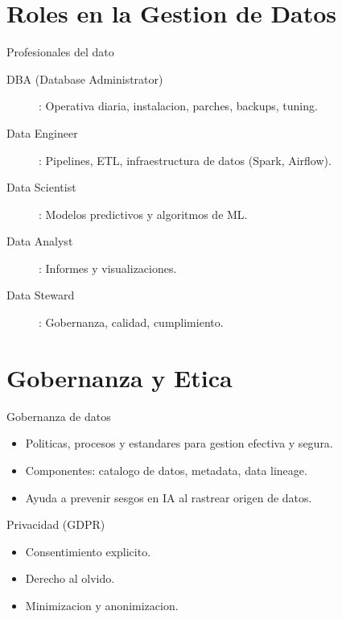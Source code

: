 \documentclass[aspectratio=169, 10pt, xcolor=table]{beamer}
\begin{document}
\section{Roles en la Gestion de Datos}

\begin{frame}{Profesionales del dato}
    \begin{description}
        \item[DBA (Database Administrator)]: Operativa diaria, instalacion, parches, backups, tuning.
        \item[Data Engineer]: Pipelines, ETL, infraestructura de datos (Spark, Airflow).
        \item[Data Scientist]: Modelos predictivos y algoritmos de ML.
        \item[Data Analyst]: Informes y visualizaciones.
        \item[Data Steward]: Gobernanza, calidad, cumplimiento.
    \end{description}
\end{frame}

\section{Gobernanza y Etica}

\begin{frame}{Gobernanza de datos}
    \begin{itemize}
        \item Politicas, procesos y estandares para gestion efectiva y segura.
        \item Componentes: catalogo de datos, metadata, data lineage.
        \item Ayuda a prevenir sesgos en IA al rastrear origen de datos.
    \end{itemize}
    \begin{block}{Privacidad (GDPR)}
        \begin{itemize}
            \item Consentimiento explicito.
            \item Derecho al olvido.
            \item Minimizacion y anonimizacion.
        \end{itemize}
    \end{block}
\end{frame}
\end{document}
